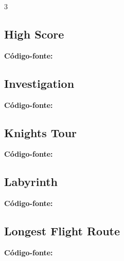 \documentclass[8pt]{extarticle}
\begin{document}
\begin{multicols*}{3}
\subsection{High Score}
\begin{caixaenunciado}

\end{caixaenunciado}
\vspace{0.3cm}
\noindent\textbf{Código-fonte:}


\subsection{Investigation}
\begin{caixaenunciado}

\end{caixaenunciado}
\vspace{0.3cm}
\noindent\textbf{Código-fonte:}


\subsection{Knights Tour}
\begin{caixaenunciado}

\end{caixaenunciado}
\vspace{0.3cm}
\noindent\textbf{Código-fonte:}


\subsection{Labyrinth}
\begin{caixaenunciado}

\end{caixaenunciado}
\vspace{0.3cm}
\noindent\textbf{Código-fonte:}


\subsection{Longest Flight Route}
\begin{caixaenunciado}

\end{caixaenunciado}
\vspace{0.3cm}
\noindent\textbf{Código-fonte:}



\end{multicols*}
\end{document}
